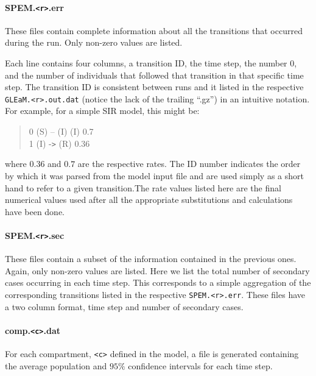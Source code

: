 \documentclass[a4paper, 11pt, fleqn]{paper}
\begin{document}
\paragraph*{SPEM.\texttt{<r>}.err}

These files contain complete information about all the transitions that occurred during the run. Only non-zero values are listed.

Each line contains four columns, a transition ID, the time step, the number $0$, and the number of individuals that followed that transition in that specific time step.  The transition ID is consistent between runs and it listed in the respective \texttt{GLEaM.\texttt{<r>}.out.dat} (notice the lack of the trailing ``.gz'') in an intuitive notation. For example, for a simple SIR model, this might be:

\begin{center}
\begin{quote}
0 (S) -- (I) (I) 0.7\\
1 (I) -\texttt{>} (R) 0.36\\
\end{quote}
\end{center}

where $0.36$ and $0.7$ are the respective rates. The ID number indicates the order by which it was parsed from the model input file and are used simply as a short hand to refer to a given transition.The rate values listed here are the final numerical values used after all the appropriate substitutions and calculations have been done. 

\paragraph*{SPEM.\texttt{<r>}.sec}

These files contain a subset of the information contained in the previous ones. Again, only non-zero values are listed.  Here we list the total number of secondary cases occurring in each time step. This corresponds to a simple aggregation of the corresponding transitions listed in the respective \texttt{SPEM.<r>.err}. These files have a two column format, time step and number of secondary cases.

\paragraph*{comp.\texttt{<c>}.dat}

For each compartment, \texttt{<c>} defined in the model, a file is generated containing the average population and $95\%$ confidence intervals for each time step.
\end{document}
